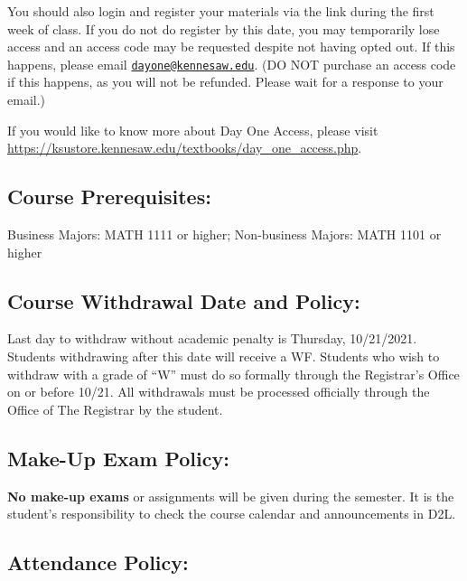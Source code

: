 \documentclass[11pt,]{article}
\begin{document}
You should also login and register your materials via the link during the first week of class. If
you do not do register by this date, you may temporarily lose access and an access code may
be requested despite not having opted out. If this happens, please
email \href{mailto:dayone@kennesaw.edu}{\nolinkurl{dayone@kennesaw.edu}}. (DO NOT purchase an access code if this happens, as you will
not be refunded. Please wait for a response to your email.)

If you would like to know more about Day One Access, please
visit \url{https://ksustore.kennesaw.edu/textbooks/day_one_access.php}.

\hypertarget{course-prerequisites}{%
\subsection{Course Prerequisites:}\label{course-prerequisites}}

Business Majors: MATH 1111 or higher; Non-business Majors: MATH 1101 or higher

\hypertarget{course-withdrawal-date-and-policy}{%
\subsection{Course Withdrawal Date and Policy:}\label{course-withdrawal-date-and-policy}}

Last day to withdraw without academic penalty is Thursday, 10/21/2021.
Students withdrawing after this date will receive a WF. Students who wish to withdraw with a grade of ``W''
must do so formally through the Registrar's Office on or before 10/21. All withdrawals must be processed
officially through the Office of The Registrar by the student.

\hypertarget{make-up-exam-policy}{%
\subsection{Make-Up Exam Policy:}\label{make-up-exam-policy}}

\textbf{No make-up exams} or assignments will be given during the semester. It is the student's responsibility to check the course calendar and announcements in D2L.

\hypertarget{attendance-policy}{%
\subsection{Attendance Policy:}\label{attendance-policy}}
\end{document}

